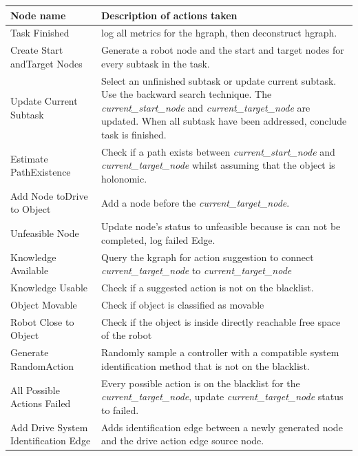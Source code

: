 \begin{table}[H]
\centering
{}
\begin{tabular}%
  {>{\raggedright\arraybackslash}p{}%
    >{\raggedright\arraybackslash}p{}}
\textbf{Node name} & \textbf{Description of actions taken}\\\toprule
Task Finished & log all metrics for the \ac{hgraph}, then deconstruct \ac{hgraph}.\\
Create Start and\newline Target Nodes & Generate a robot node and the start and target nodes for every subtask in the task.\\
Update Current Subtask & Select an unfinished subtask or update current subtask. Use the backward search technique. The \textit{current\_start\_node} and \textit{current\_target\_node} are updated. When all subtask have been addressed, conclude task is finished. \\
Estimate Path\newline Existence & Check if a path exists between \textit{current\_start\_node} and \textit{current\_target\_node} whilst assuming that the object is holonomic.\\
Add Node to\newline Drive to Object & Add a node before the \textit{current\_target\_node}.\\
Unfeasible Node & Update node's status to unfeasible because is can not be completed, log failed Edge.\\
Knowledge Available& Query the \ac{kgraph} for action suggestion to connect \textit{current\_target\_node} to \textit{current\_target\_node}\\
Knowledge Usable& Check if a suggested action is not on the blacklist.\\
Object Movable & Check if object is classified as movable\\
Robot Close to Object& Check if the object is inside directly reachable free space of the robot \\
Generate Random\newline Action& Randomly sample a controller with a compatible system identification method that is not on the blacklist. \\
All Possible Actions Failed & Every possible action is on the blacklist for the \textit{current\_target\_node}, update \textit{current\_target\_node} status to failed.\\
Add Drive System Identification Edge & Adds identification edge between a newly generated node and the drive action edge source node. \\

\end{tabular}
\end{table}
